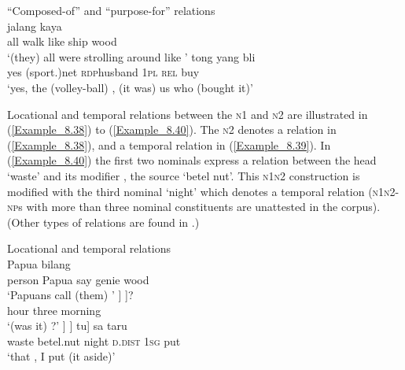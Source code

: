 \ea 
``Composed-of'' and ``purpose-for'' relations\\
\ea
\label{Example_8.36}
 {jalang} {kaya} {} {}\\ %
 all  walk  like  ship  wood\\
\glt 
‘(they) all were strolling around like ’ \textstyleExampleSource{[081025-009a-Cv.0188]}
\vspace{5pt}
\ex
\label{Example_8.37}
 {} {} {tong} {yang} {bli}\\ %
 yes  (sport.)net  \textsc{rdp}{\Tilde}husband  \textsc{1pl}  \textsc{rel}  buy\\
\glt 
‘yes, the (volley-ball) , (it was) us who (bought it)’ \textstyleExampleSource{[081023-001-Cv.0012]}
\z
\z



Locational and temporal relations between the \textsc{n1} and \textsc{n2} are illustrated in (\ref{Example_8.38}) to (\ref{Example_8.40}). The \textsc{n2} denotes a  relation in (\ref{Example_8.38}), and a temporal relation in (\ref{Example_8.39}). In (\ref{Example_8.40}) the first two nominals express a  relation between the head  ‘waste’ and its modifier , the source  ‘betel nut’. This \textsc{n1n2} construction is modified with the third nominal  ‘night’ which denotes a temporal relation (\textsc{n1n2-np}s with more than three nominal constituents are unattested in the corpus). (Other types of  relations are found in .)


\ea 
Locational and temporal relations \\
\ea
\label{Example_8.38}
 {Papua} {bilang} {} {}\\ %
 person  Papua  say  genie  wood\\
\glt 
‘Papuans call (them) ’ \textstyleExampleSource{[081006-022-CvEx.0054]}
\vspace{5pt}
\ex
\label{Example_8.39}
\gll {[[\bluebold{jam}} {]} {]?}\\ %
 hour  three  morning\\
\glt 
‘(was it) ?’ \textstyleExampleSource{[080918-001-CvNP.0042]}
\vspace{5pt}
\ex
\label{Example_8.40}
\gll {[[[\bluebold{ampas}} {]} {]} {tu]} {sa} {taru}\\ %
 waste  betel.nut  night  \textsc{d.dist}  \textsc{1sg}  put\\
\glt 
‘that , I put (it aside)’ \textstyleExampleSource{[081025-006-Cv.0294]}
\z
\z


